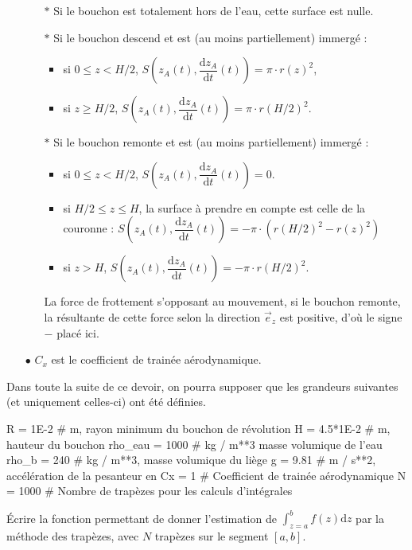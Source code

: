 \begin{itemize}
\begin{itemize}
\item[$\ast$] Si le bouchon est totalement hors de l'eau, cette surface est nulle. 
\item[$\ast$] Si le bouchon descend et est (au moins partiellement) immergé  :
\begin{itemize}
\item si $0\leq z<H/2$, $S\left(z_A(t),\dfrac{\mathrm{d}z_A}{\mathrm{d}t}(t)\right) = \pi\cdot r(z)^2$,
\item si $z \geq H/2$,  $S\left(z_A(t),\dfrac{\mathrm{d}z_A}{\mathrm{d}t}(t)\right) = \pi\cdot r(H/2)^2$.
\end{itemize}
\item[$\ast$] Si le bouchon remonte et est (au moins partiellement) immergé  :
\begin{itemize}
\item si $0\leq z<H/2$, $S\left(z_A(t),\dfrac{\mathrm{d}z_A}{\mathrm{d}t}(t)\right) = 0$.
\item si $H/2\leq z \leq H$, la surface à prendre en compte est celle de la couronne  : $S\left(z_A(t),\dfrac{\mathrm{d}z_A}{\mathrm{d}t}(t)\right) = - \pi\cdot \left(r(H/2)^2-r(z)^2\right)$
\item si $z > H$, $S\left(z_A(t),\dfrac{\mathrm{d}z_A}{\mathrm{d}t}(t)\right) = - \pi\cdot r(H/2)^2$. 
\end{itemize}
La force de frottement s'opposant au mouvement, si le bouchon remonte, la résultante de cette force selon la direction $\overrightarrow{e}_z$ est positive, d'où le signe $-$ placé ici. 
\end{itemize}
\item[$\bullet$] $C_x$ est le coefficient de trainée aérodynamique.
\end{itemize}

Dans toute la suite de ce devoir, on pourra supposer que les grandeurs suivantes (et uniquement celles-ci) ont été définies.
\begin{pyverbatim}
R = 1E-2 # m, rayon minimum du bouchon de révolution
H = 4.5*1E-2 # m, hauteur du bouchon
rho_eau = 1000 # kg / m**3 masse volumique de l'eau
rho_b = 240 # kg / m**3, masse volumique du liège
g = 9.81 # m / s**2, accélération de la pesanteur en
Cx = 1 # Coefficient de trainée aérodynamique
N = 1000 # Nombre de trapèzes pour les calculs d'intégrales
\end{pyverbatim}

\question{} Écrire la fonction  permettant de donner l'estimation de $\displaystyle{\int_{z=a}^b f(z)\mathrm{d}z}$ par la méthode des trapèzes, avec $N$ trapèzes sur le segment $\left[a,b\right]$.

